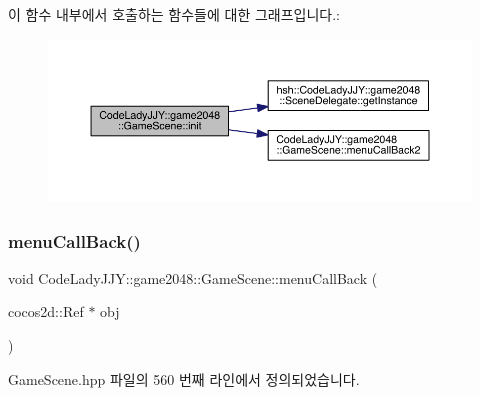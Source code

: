 이 함수 내부에서 호출하는 함수들에 대한 그래프입니다.\+:
\nopagebreak
\begin{figure}[H]
\begin{center}
\leavevmode
\includegraphics[width=350pt]{d1/d76/class_code_lady_j_j_y_1_1game2048_1_1_game_scene_ab0ccbc102ba9ceca94daddc2e8f253ba_cgraph}
\end{center}
\end{figure}
\mbox{\label{class_code_lady_j_j_y_1_1game2048_1_1_game_scene_ac748b7487b72bc4722b7bbdb181e7267}} 
\subsubsection{\texorpdfstring{menu\+Call\+Back()}{menuCallBack()}}
{\footnotesize\ttfamily void Code\+Lady\+J\+J\+Y\+::game2048\+::\+Game\+Scene\+::menu\+Call\+Back (\begin{DoxyParamCaption}\item[{cocos2d\+::\+Ref $\ast$}]{obj }\end{DoxyParamCaption})\hspace{0.3cm}{\ttfamily [inline]}}



Game\+Scene.\+hpp 파일의 560 번째 라인에서 정의되었습니다.



